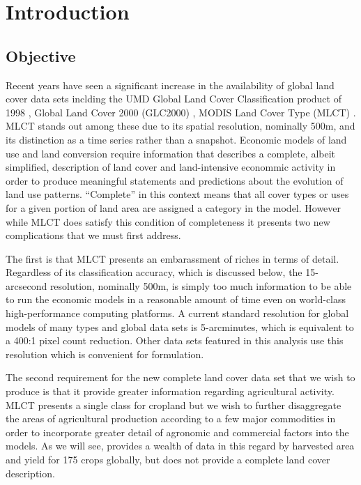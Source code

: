 
\chapter{Introduction}
\label{cha:introduction}

\section{Objective}
\label{sec:objective}

Recent years have seen a significant increase in the availability of
global land cover data sets inclding the UMD Global Land Cover
Classification product of 1998 \citep{Hansen2000}, Global Land Cover
2000 (GLC2000) , 
MODIS Land Cover Type (MLCT) .  MLCT stands out
among these due to its spatial resolution, nominally 500m, and its
distinction as a time series rather than a snapshot.  Economic models
of land use and land conversion require information that describes a
complete, albeit simplified, description of land cover and
land-intensive econommic activity in order to produce meaningful
statements and predictions about the evolution of land use patterns.
``Complete'' in this context means that all cover types or uses for a
given portion of land area are assigned a category in the model.
However while MLCT does satisfy this condition of completeness it
presents two new complications that we must first address.

The first is that MLCT presents an embarassment of riches in terms of
detail.  Regardless of its classification accuracy, which is discussed
below, the 15-arcsecond resolution, nominally 500m, is simply too much
information to be able to run the economic models in a reasonable
amount of time even on world-class high-performance computing
platforms.  A current standard resolution for global models of many
types and global data sets is 5-arcminutes, which is equivalent to a
400:1 pixel count reduction.  Other data sets featured in this
analysis use this resolution which is convenient for formulation.

The second requirement for the new complete land cover data set that
we wish to produce is that it provide greater information regarding
agricultural activity.  MLCT presents a single class for cropland but
we wish to further disaggregate the areas of agricultural production
according to a few major commodities in order to incorporate greater
detail of agronomic and commercial factors into the models.  As we
will see, \citet{Monfreda2008} provides a wealth of data in this
regard by harvested area and yield for 175 crops globally, but does
not provide a complete land cover description.  

